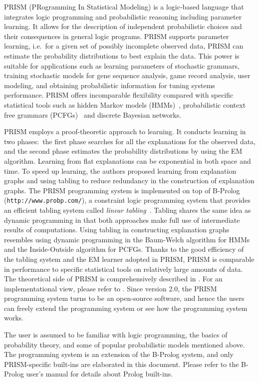 \documentclass[a4paper]{report}
\makeatletter
\let\tts@ve\tt
\def\tt{\tts@ve\ifmmode\def\_{\mathchar`\_}\else\def\_{\char`\_}\fi}
\makeatother
\begin{document}
PRISM (PRogramming In Statistical Modeling) is a logic-based language that
integrates logic programming and probabilistic reasoning including parameter
learning.  It allows for the description of independent probabilistic
choices and their consequences in general logic programs. PRISM supports
parameter learning, i.e.\ for a given set of possibly incomplete observed data,
PRISM can estimate the probability distributions to best explain the data.
This power is suitable for applications such as learning parameters of
stochastic grammars, training stochastic models for gene sequence analysis,
game record analysis, user modeling,
and obtaining probabilistic information for tuning systems performance.
PRISM offers incomparable flexibility compared with specific statistical
tools such as hidden Markov models (HMMs)~\cite{Charniak93,Rabiner89},
probabilistic context free grammars (PCFGs)~\cite{Charniak93}
and discrete Bayesian networks.

PRISM employs a proof-theoretic approach to learning. It conducts learning
in two phases:\ the first phase searches for all the explanations for the
observed data, and the second phase estimates the probability distributions
by using the EM algorithm. Learning from flat explanations can be
exponential in both space and time. To speed up learning, the authors
proposed learning from explanation graphs and using tabling to reduce
redundancy in the construction of explanation graphs.  The PRISM programming
system is implemented on top of B-Prolog ({\tt http://www.probp.com/}),
a constraint logic programming system that provides
an efficient tabling system called {\em linear tabling}~\cite{Zhou03b}.
Tabling shares the same idea as dynamic programming in that
both approaches make full use of intermediate
results of computations. Using tabling in constructing explanation graphs
resembles using dynamic programming in the Baum-Welch algorithm for HMMs  and
the Inside-Outside algorithm for PCFGs. Thanks to the good efficiency of
the tabling system and the EM learner adopted in PRISM, PRISM is comparable
in performance to specific statistical tools on relatively large amounts of
data.  The theoretical side of PRISM is comprehensively described in
\cite{Sato01b}.  For an implementational view, please refer to \cite{Zhou03a}.
Since version 2.0, the PRISM programming system turns to be an open-source
software, and hence the users can freely extend the programming system or
see how the programming system works.

The user is assumed to be familiar with logic programming, the basics of
probability theory, and some of popular probabilistic models mentioned above.
The programming system is an extension of the B-Prolog system, and only
PRISM-specific built-ins are elaborated in this document. Please refer
to the B-Prolog user's manual for details about Prolog built-ins.
\end{document}

